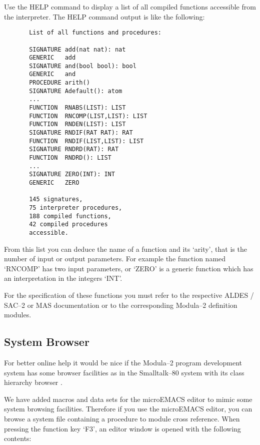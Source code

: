 Use the HELP command to display a list of all 
compiled functions accessible from the interpreter.  
The HELP command output is like the following:

\begin{verbatim}
       List of all functions and procedures: 
        
       SIGNATURE add(nat nat): nat 
       GENERIC   add 
       SIGNATURE and(bool bool): bool 
       GENERIC   and 
       PROCEDURE arith()
       SIGNATURE Adefault(): atom 
       ...
       FUNCTION  RNABS(LIST): LIST
       FUNCTION  RNCOMP(LIST,LIST): LIST
       FUNCTION  RNDEN(LIST): LIST
       SIGNATURE RNDIF(RAT RAT): RAT 
       FUNCTION  RNDIF(LIST,LIST): LIST
       SIGNATURE RNDRD(RAT): RAT 
       FUNCTION  RNDRD(): LIST
       ...
       SIGNATURE ZERO(INT): INT 
       GENERIC   ZERO 
        
       145 signatures, 
       75 interpreter procedures, 
       188 compiled functions, 
       42 compiled procedures 
       accessible.
\end{verbatim}

From this list you can deduce the name of a function 
and its `arity', that is the number of input  
or output parameters.
For example the function named `RNCOMP' has 
two input parameters, 
or `ZERO' is a generic function 
which has an interpretation in the integers `INT'. 

For the specification of these functions you must refer 
to the respective ALDES / SAC--2 or MAS documentation or
to the corresponding Modula--2 definition modules.

\subsection{System Browser}

For better online help it would be nice if the  
Modula--2 program development system has some 
browser facilities as in the 
Smalltalk--80 system with its class hierarchy 
browser \cite{Goldberg 81}. 

We have added macros and data sets for the
microEMACS editor 
to mimic some system browsing facilities.
Therefore if you use the microEMACS editor, 
you can browse 
a system file containing a procedure to module cross reference.
When pressing the function key `F3', an editor window is
opened with the following contents:

